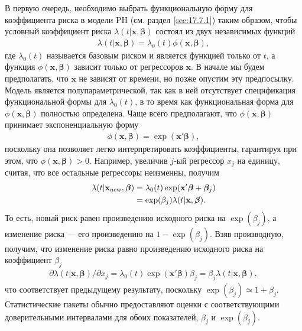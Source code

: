 \noindent
В первую очередь, необходимо выбрать функциональную форму для коэффициента риска в модели PH (см. раздел \ref{sec:17.7.1}) таким образом, чтобы условный коэффициент риска $\lambda(t|\mathbf{x},\bm{\beta})$ состоял из двух независимых функций
        \begin{align}
        \label{eq:17.25}
        \lambda(t|\mathbf{x},\bm{\beta})=\lambda_0(t)\phi(\mathbf{x},\bm{\beta}),
        \end{align}
где $\lambda_0(t)$ называется базовым риском и является функцией только от $t$, а функция $\phi(\mathbf{x},\bm{\beta})$ зависит только от регрессоров $\mathbf{x}$. В начале мы будем предполагать, что $\mathbf{x}$ не зависят от времени, но позже опустим эту предпосылку. Модель является полупараметрической, так как в ней отсутствует спецификация функциональной формы для $\lambda_0(t)$, в то время как функциональная форма для $\phi(\mathbf{x},\bm{\beta})$ полностью определена. Чаще всего предполагают, что $\phi(\mathbf{x},\bm{\beta})$ принимает экспоненциальную форму
        \begin{align}
        \label{eq:17.26}
        \phi(\mathbf{x},\bm{\beta})=\exp(\mathbf{x}'\bm{\beta}),
        \end{align}
поскольку она позволяет легко интерпретировать коэффициенты, гарантируя при этом, что $\phi(\mathbf{x},\bm{\beta})>0$. Например, увеличив $j$-ый регрессор $x_j$ на единицу, считая, что все остальные регрессоры неизменны, получим
        \begin{align}
        \label{eq:17.27}
        \lambda(t|\mathbf{x}_{\textrm{new}},\bm{\beta})&=\lambda_0(t)\exp(\mathbf{x}'\bm{\beta}+\bm{\beta}_j)\\
        &=\exp(\beta_j)\lambda(t|\mathbf{x},\bm{\beta}).\notag
        \end{align}
То есть, новый риск равен произведению исходного риска на $\exp(\beta_j)$, а изменение риска --- его произведению на $1-\exp(\beta_j)$. Взяв производную, получим, что изменение риска равно произведению исходного риска на коэффициент $\beta_j$
        \begin{align}
        \label{eq:17.28}
        \partial\lambda(t|\mathbf{x},\bm{\beta})/\partial x_j=\lambda_0(t)\exp(\mathbf{x}'\bm{\beta})\beta_j=\beta_j\lambda(t|\mathbf{x},\bm{\beta}),
        \end{align}
что соответствует предыдущему результату, поскольку $\exp(\beta_j)\simeq1+\beta_j$. Статистические пакеты обычно предоставляют оценки с соответствующими доверительными интервалами для обоих показателей, $\beta_j$ и $\exp(\beta_j)$.

